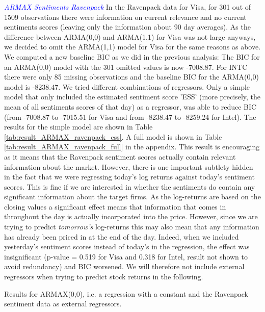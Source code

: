 \textit{\textcolor{blue}{ARMAX Sentiments Ravenpack}}
In the Ravenpack data for Visa, for 301 out of 1509 observations there were information on current relevance and no current sentiments scores (leaving only the information about 90 day averages). As the difference between ARMA(0,0) and ARMA(1,1) for Visa was not large anyways, we decided to omit the ARMA(1,1) model for Visa for the same reasons as above. We computed a new baseline BIC as we did in the previous analysis: The BIC for an ARMA(0,0) model with the 301 omitted values is now -7008.87. For INTC there were only 85 missing observations and the baseline BIC for the ARMA(0,0) model is -8238.47. We tried different combinations of regressors. Only a simple model that only included the estimated sentiment score 'ESS' (more precisely, the mean of all sentiments scores of that day) as a regressor, was able to reduce BIC (from -7008.87 to -7015.51 for Visa and from -8238.47 to -8259.24 for Intel). The results for the simple model are shown in Table \ref{tab:result_ARMAX_ravenpack_ess}. A full model is shown in Table \ref{tab:result_ARMAX_ravenpack_full} in the appendix. This result is encouraging as it means that the Ravenpack sentiment scores actually contain relevant information about the market. However, there is one important subtlety hidden in the fact that we were regressing today's log returns against today's sentiment scores. This is fine if we are interested in whether the sentiments do contain any significant information about the target firms. As the log-returns are based on the closing values a significant effect means that information that comes in throughout the day is actually incorporated into the price. However, since we are trying to predict \textit{tomorrow's} log-returns this may also mean that any information has already been priced in at the end of the day. Indeed, when we included yesterday's sentiment scores instead of today's in the regression, the effect was insignificant (p-value = 0.519 for Visa and 0.318 for Intel, result not shown to avoid redundancy) and BIC worsened. We will therefore not include external regressors when trying to predict stock returns in the following. 

\begin{table}[h!]
    \centering
    \vspace{-2ex}
    \small
    
    \vspace{1ex}

    \vspace{-2ex}
    \small
    
    \caption{Results for ARMAX(0,0), i.e. a regression with a constant and the Ravenpack sentiment data as external regressors.}
    \label{tab:result_ARMAX_ravenpack_ess}
\end{table}

